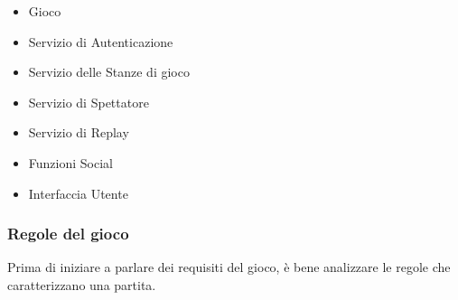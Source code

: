              \begin {itemize}
             \item Gioco
             \item Servizio di Autenticazione
             \item Servizio delle Stanze di gioco
             \item Servizio di Spettatore
             \item Servizio di Replay
             \item Funzioni Social
             \item Interfaccia Utente
             \end {itemize}

            \subsubsection[Gioco]{\large {Regole del gioco}\label{subsub:requirements:game}}
            Prima di iniziare a parlare dei requisiti del gioco, è bene analizzare le regole che caratterizzano una partita.

